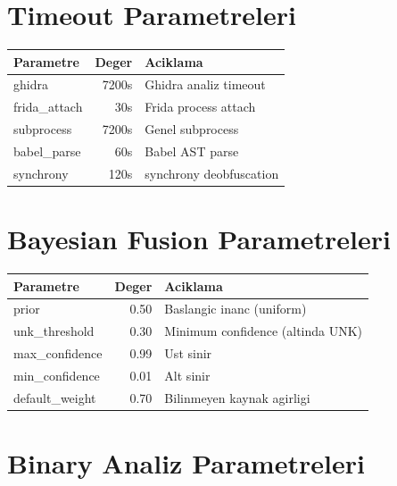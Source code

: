\documentclass[12pt,a4paper,oneside]{book}
\theoremstyle{definition}
\begin{document}
\section{Timeout Parametreleri}

\begin{table}[h]
\centering
\begin{tabular}{lrl}
\toprule
\textbf{\color{sectioncyan}Parametre} & \textbf{\color{sectioncyan}Deger} & \textbf{\color{sectioncyan}Aciklama} \\
\midrule
ghidra & 7200s & Ghidra analiz timeout \\
frida\_attach & 30s & Frida process attach \\
subprocess & 7200s & Genel subprocess \\
babel\_parse & 60s & Babel AST parse \\
synchrony & 120s & synchrony deobfuscation \\
\bottomrule
\end{tabular}
\end{table}

\section{Bayesian Fusion Parametreleri}

\begin{table}[h]
\centering
\begin{tabular}{lrl}
\toprule
\textbf{\color{sectioncyan}Parametre} & \textbf{\color{sectioncyan}Deger} & \textbf{\color{sectioncyan}Aciklama} \\
\midrule
prior & 0.50 & Baslangic inanc (uniform) \\
unk\_threshold & 0.30 & Minimum confidence (altinda UNK) \\
max\_confidence & 0.99 & Ust sinir \\
min\_confidence & 0.01 & Alt sinir \\
default\_weight & 0.70 & Bilinmeyen kaynak agirligi \\
\bottomrule
\end{tabular}
\end{table}

\section{Binary Analiz Parametreleri}
\end{document}
